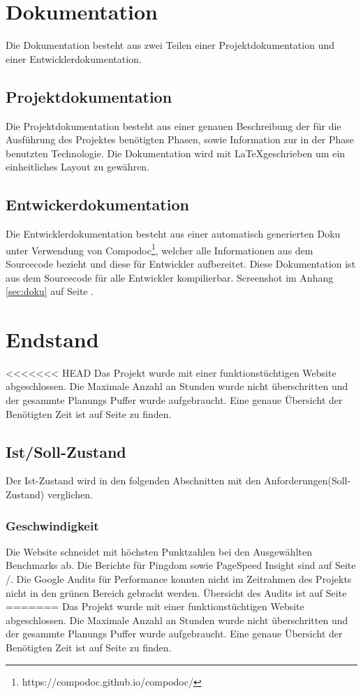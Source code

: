 \documentclass[11pt,a4paper]{article}
\begin{document}
\section{Dokumentation}
Die Dokumentation besteht aus zwei Teilen einer Projektdokumentation und einer Entwicklerdokumentation.
\subsection{Projektdokumentation}
Die Projektdokumentation besteht aus einer genauen Beschreibung der für die Ausführung des Projektes benötigten Phasen, sowie Information zur in der Phase benutzten Technologie.
Die Dokumentation wird mit \LaTeX geschrieben um ein einheitliches Layout zu gewähren.
\subsection{Entwickerdokumentation}
Die Entwicklerdokumentation besteht aus einer automatisch generierten Doku unter Verwendung von Compodoc\footnote{https://compodoc.github.io/compodoc/}, welcher alle Informationen aus dem Sourcecode bezieht und diese für Entwickler aufbereitet. Diese Dokumentation ist aus dem Sourcecode für alle Entwickler kompilierbar. Screenshot im Anhang \ref{sec:doku} auf Seite \pageref{sec:doku}.
\section{Endstand}
<<<<<<< HEAD
Das Projekt wurde mit einer funktionstüchtigen Website abgeschlossen.  Die Maximale Anzahl an Stunden wurde nicht überschritten und der gesammte Planungs Puffer wurde aufgebraucht. Eine genaue Übersicht der Benötigten Zeit ist auf Seite \pageref{sec:time} zu finden.
\subsection{Ist/Soll-Zustand}
Der Ist-Zustand wird in den folgenden Abschnitten mit den Anforderungen(Soll-Zustand) verglichen.
\subsubsection{Geschwindigkeit}
Die Website schneidet mit höchsten Punktzahlen bei den Ausgewählten Benchmarks ab.
Die Berichte für Pingdom sowie PageSpeed Insight sind auf Seite  \pageref{sec:google}/\pageref{sec:pingdom}. Die Google Audits für Performance konnten nicht im Zeitrahmen des Projekts nicht in den grünen Bereich gebracht werden. Übersicht des Audits ist auf Seite \pageref{sec:audit}
=======
Das Projekt wurde mit einer funktionstüchtigen Website abgeschlossen. Die Maximale Anzahl an Stunden wurde nicht überschritten und der gesammte Planungs Puffer wurde aufgebraucht. Eine genaue Übersicht der Benötigten Zeit ist auf Seite \pageref{sec:time} zu finden.
\end{document}
